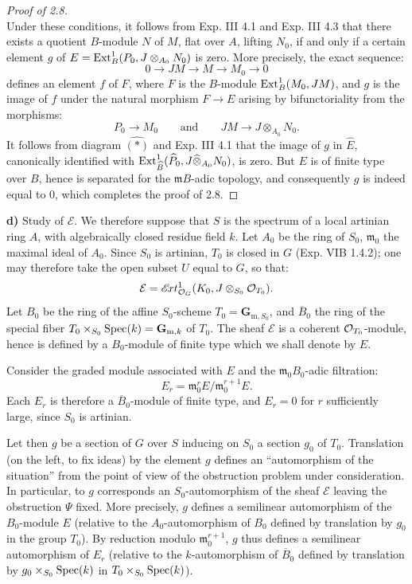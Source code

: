 \begin{proof}[Proof of 2.8]
\[\]
Under these conditions, it follows from Exp. III 4.1 and Exp. III 4.3 that there exists a quotient $B$-module $N$ of $M$, flat over $A$, lifting $N_0$, if and only if a certain element $g$ of $E=\operatorname{Ext}^1_B(P_0,J\otimes_{A_0}N_0)$ is zero. More precisely, the exact sequence:
\[
0\to JM\to M\to M_0\to0
\]
defines an element $f$ of $F$, where $F$ is the $B$-module $\operatorname{Ext}^1_B(M_0,JM)$, and $g$ is the image of $f$ under the natural morphism $F\to E$ arising by bifunctoriality from the morphisms:
\[
P_0\to M_0\qquad\text{and}\qquad JM\to J\otimes_{A_0}N_0.
\]
It follows from diagram $\widehat{(\ast)}$ and Exp. III 4.1 that the image of $g$ in $\widehat E$, canonically identified with $\operatorname{Ext}^1_{\widehat B}(\widehat P_0,J\widehat\otimes_{A_0}N_0)$, is zero. But $E$ is of finite type over $B$, hence is separated for the $\mathfrak mB$-adic topology, and consequently $g$ is indeed equal to $0$, which completes the proof of 2.8.
\end{proof}

\noindent\textbf{d)} Study of $\mathcal E$. We therefore suppose that $S$ is the spectrum of a local artinian ring $A$, with algebraically closed residue field $k$. Let $A_0$ be the ring of $S_0$, $\mathfrak m_0$ the maximal ideal of $A_0$. Since $S_0$ is artinian, $T_0$ is closed in $G$ (Exp. VIB 1.4.2); one may therefore take the open subset $U$ equal to $G$, so that:
\[
\mathcal E=\mathscr{E}\!xt^{1}_{\mathcal{O}_G}(K_0,J\otimes_{S_0}\mathcal{O}_{T_0}).
\]
Let $B_0$ be the ring of the affine $S_0$-scheme $T_0=\mathbf G_{\mathrm m,S_0}$, and $\overline B_0$ the ring of the special fiber $T_0\times_{S_0}\operatorname{Spec}(k)=\mathbf G_{\mathrm m,k}$ of $T_0$. The sheaf $\mathcal E$ is a coherent $\mathcal{O}_{T_0}$-module, hence is defined by a $B_0$-module of finite type which we shall denote by $E$.

Consider the graded module associated with $E$ and the $\mathfrak m_0B_0$-adic filtration:
\[
E_r=\mathfrak m_0^rE/\mathfrak m_0^{r+1}E.
\]
Each $E_r$ is therefore a $\overline B_0$-module of finite type, and $E_r=0$ for $r$ sufficiently large, since $S_0$ is artinian.

Let then $g$ be a section of $G$ over $S$ inducing on $S_0$ a section $g_0$ of $T_0$. Translation (on the left, to fix ideas) by the element $g$ defines an ``automorphism of the situation'' from the point of view of the obstruction problem under consideration. In particular, to $g$ corresponds an $S_0$-automorphism of the sheaf $\mathcal E$ leaving the obstruction $\Psi$ fixed. More precisely, $g$ defines a semilinear automorphism of the $B_0$-module $E$ (relative to the $A_0$-automorphism of $B_0$ defined by translation by $g_0$ in the group $T_0$). By reduction modulo $\mathfrak m_0^{r+1}$, $g$ thus defines a semilinear automorphism of $E_r$ (relative to the $k$-automorphism of $\overline B_0$ defined by translation by $g_0\times_{S_0}\operatorname{Spec}(k)$ in $T_0\times_{S_0}\operatorname{Spec}(k)$).

